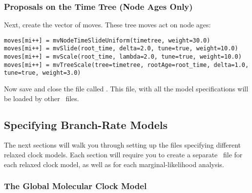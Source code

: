 \subsubsection{Proposals on the Time Tree (Node Ages Only)}

Next, create the vector of moves. These tree moves act on node ages:
{\tt \begin{snugshade*}
\begin{lstlisting}
moves[mi++] = mvNodeTimeSlideUniform(timetree, weight=30.0)
moves[mi++] = mvSlide(root_time, delta=2.0, tune=true, weight=10.0)
moves[mi++] = mvScale(root_time, lambda=2.0, tune=true, weight=10.0)
moves[mi++] = mvTreeScale(tree=timetree, rootAge=root_time, delta=1.0, tune=true, weight=3.0)
\end{lstlisting}
\end{snugshade*}}

%

Now save and close the file called {\textcolor{red}{}}. This file, with all the model specifications will be loaded by other \Rev~files. 

\bigskip
\subsection{Specifying Branch-Rate Models}\label{brMods} 

The next sections will walk you through setting up the files specifying different relaxed clock models. 
Each section will require you to create a separate \Rev~file for each relaxed clock model, as well as for each marginal-likelihood analysis.

\bigskip
\subsubsection{The Global Molecular Clock Model}\label{globalClockSec}

